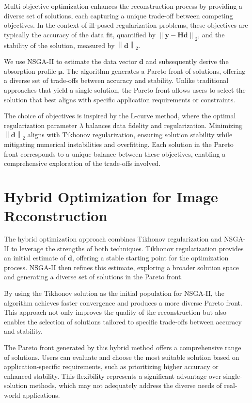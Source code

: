 Multi-objective optimization enhances the reconstruction process by providing a diverse set of solutions, each capturing a unique trade-off between competing objectives. In the context of ill-posed regularization problems, these objectives are typically the accuracy of the data fit, quantified by \( \left\| \mathbf{y} - \mathbf{H} \mathbf{d} \right\|_2 \), and the stability of the solution, measured by \( \left\| \mathbf{d} \right\|_2 \).

We use NSGA-II to estimate the data vector \( \mathbf{d} \) and subsequently derive the absorption profile \( \mathbf{\mu} \). The algorithm generates a Pareto front of solutions, offering a diverse set of trade-offs between accuracy and stability. Unlike traditional approaches that yield a single solution, the Pareto front allows users to select the solution that best aligns with specific application requirements or constraints.

The choice of objectives is inspired by the L-curve method, where the optimal regularization parameter \( \lambda \) balances data fidelity and regularization. Minimizing \( \left\| \mathbf{d} \right\|_2 \) aligns with Tikhonov regularization, ensuring solution stability while mitigating numerical instabilities and overfitting. Each solution in the Pareto front corresponds to a unique balance between these objectives, enabling a comprehensive exploration of the trade-offs involved.

\section{Hybrid Optimization for Image Reconstruction} \label{sec:method:third}

The hybrid optimization approach combines Tikhonov regularization and NSGA-II to leverage the strengths of both techniques. Tikhonov regularization provides an initial estimate of \( \mathbf{d} \), offering a stable starting point for the optimization process. NSGA-II then refines this estimate, exploring a broader solution space and generating a diverse set of solutions in the Pareto front.

By using the Tikhonov solution as the initial population for NSGA-II, the algorithm achieves faster convergence and produces a more diverse Pareto front. This approach not only improves the quality of the reconstruction but also enables the selection of solutions tailored to specific trade-offs between accuracy and stability. 

The Pareto front generated by this hybrid method offers a comprehensive range of solutions. Users can evaluate and choose the most suitable solution based on application-specific requirements, such as prioritizing higher accuracy or enhanced stability. This flexibility represents a significant advantage over single-solution methods, which may not adequately address the diverse needs of real-world applications.
